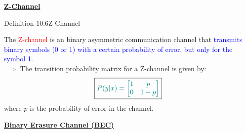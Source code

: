 \documentclass{book}
\begin{document}
\uline{\textbf{Z-Channel}}\\
\begin{defBox}{Definition 10.6}{Z-Channel}
    \begin{figure}
    \end{figure}
    The \textcolor{red}{Z-channel} is an binary asymmetric communication channel that \textcolor{blue}{transmits binary symbols (0 or 1) with a certain probability of error, but only for the symbol 1}.\\
    $\implies$ The transition probability matrix for a Z-channel is given by:
    \[
        \boxed{\textcolor{teal}{P(y|x) = \begin{bmatrix} 
            1 & p \\
            0 & 1 - p
        \end{bmatrix}}}
    \]
    where $p$ is the probability of error in the channel.
\end{defBox}
\uline{\textbf{Binary Erasure Channel (BEC)}}\\
\end{document}
